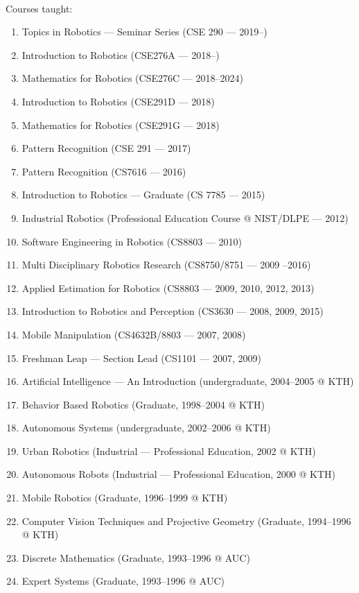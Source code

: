 \documentclass{article}
\begin{document}
\begin{cv}
\begin{cvlist}{~}
		\item[Courses taught:]
		\begin{enumerate}
			\item Topics in Robotics --- Seminar Series (CSE 290 --- 2019--)
			\item Introduction to Robotics (CSE276A --- 2018--)
			\item Mathematics for Robotics (CSE276C --- 2018--2024)
			\item Introduction to Robotics (CSE291D --- 2018)
			\item Mathematics for Robotics (CSE291G --- 2018)
			\item Pattern Recognition (CSE 291 --- 2017)
			\item Pattern Recognition (CS7616 --- 2016)
			\item Introduction to Robotics --- Graduate (CS 7785 --- 2015)
			\item Industrial Robotics (Professional Education Course @ NIST/DLPE
			      --- 2012)
			\item Software Engineering in Robotics (CS8803 --- 2010)
			\item Multi Disciplinary Robotics Research (CS8750/8751 --- 2009 --2016)
			\item Applied Estimation for Robotics (CS8803 --- 2009, 2010, 2012, 2013)
			\item Introduction to Robotics and Perception (CS3630 --- 2008, 2009, 2015)
			\item Mobile Manipulation (CS4632B/8803 --- 2007, 2008)
			\item Freshman Leap --- Section Lead (CS1101 --- 2007, 2009)
			\item Artificial Intelligence --- An Introduction (undergraduate,
			      2004--2005 @ KTH)
			\item Behavior Based Robotics (Graduate, 1998--2004 @ KTH)
			\item Autonomous Systems (undergraduate, 2002--2006 @ KTH)
			\item Urban Robotics (Industrial --- Professional Education, 2002 @ KTH)
			\item Autonomous Robots (Industrial --- Professional Education, 2000 @  KTH)
			\item Mobile Robotics (Graduate, 1996--1999 @ KTH)
			\item Computer Vision Techniques and Projective Geometry (Graduate,
			      1994--1996 @ KTH)
			\item Discrete Mathematics (Graduate, 1993--1996 @ AUC)
			\item Expert Systems (Graduate, 1993--1996 @ AUC)

\end{enumerate}
\end{cvlist}
\end{cv}
\end{document}
